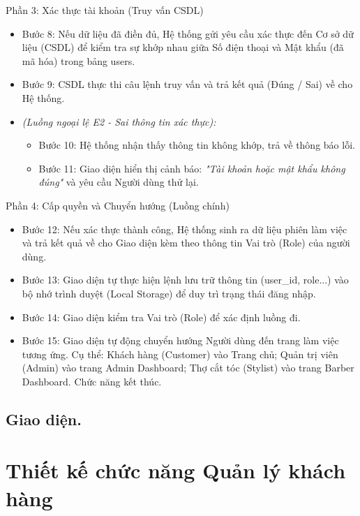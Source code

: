 \documentclass[../BTL.tex]{subfiles}
\begin{document}
Phần 3: Xác thực tài khoản (Truy vấn CSDL)

\begin{itemize}
\item
  Bước 8: Nếu dữ liệu đã điền đủ, Hệ thống gửi yêu cầu xác thực đến Cơ
  sở dữ liệu (CSDL) để kiểm tra sự khớp nhau giữa Số điện thoại và Mật
  khẩu (đã mã hóa) trong bảng users.
\item
  Bước 9: CSDL thực thi câu lệnh truy vấn và trả kết quả (Đúng / Sai) về
  cho Hệ thống.
\item
  \emph{(Luồng ngoại lệ E2 - Sai thông tin xác thực):}

  \begin{itemize}
  \item
    Bước 10: Hệ thống nhận thấy thông tin không khớp, trả về thông báo
    lỗi.
  \item
    Bước 11: Giao diện hiển thị cảnh báo: \emph{"Tài khoản hoặc mật khẩu
    không đúng"} và yêu cầu Người dùng thử lại.
  \end{itemize}
\end{itemize}

Phần 4: Cấp quyền và Chuyển hướng (Luồng chính)

\begin{itemize}
\item
  Bước 12: Nếu xác thực thành công, Hệ thống sinh ra dữ liệu phiên làm
  việc và trả kết quả về cho Giao diện kèm theo thông tin Vai trò (Role)
  của người dùng.
\item
  Bước 13: Giao diện tự thực hiện lệnh lưu trữ thông tin (user\_id,
  role...) vào bộ nhớ trình duyệt (Local Storage) để duy trì trạng thái
  đăng nhập.
\item
  Bước 14: Giao diện kiểm tra Vai trò (Role) để xác định luồng đi.
\item
  Bước 15: Giao diện tự động chuyển hướng Người dùng đến trang làm việc
  tương ứng. Cụ thể: Khách hàng (Customer) vào Trang chủ; Quản trị viên
  (Admin) vào trang Admin Dashboard; Thợ cắt tóc (Stylist) vào trang
  Barber Dashboard. Chức năng kết thúc.
\end{itemize}

\subsection{Giao diện.}


\section{Thiết kế chức năng Quản lý khách hàng}
\end{document}

